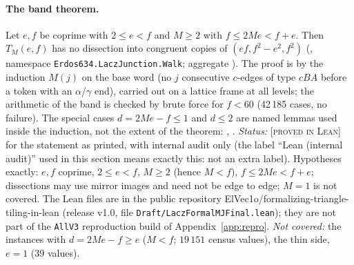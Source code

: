 \documentclass[11pt,reqno]{amsart}
\theoremstyle{plain}
\theoremstyle{definition}
\newcommand{\lab}[1]{\textup{[\textsc{#1}]}}
\newcommand{\PL}{\lab{proved in Lean}}
\begin{document}
\paragraph{The band theorem.} Let $e,f$ be coprime with $2\le e<f$ and $M\ge2$ with $f\le 2Me<f+e$. Then $T_M(e,f)$ has no dissection into congruent copies of $(ef,f^2-e^2,f^2)$
(, namespace \texttt{Erdos634.LaczJunction.Walk}; aggregate ). The proof is by the induction $M(j)$ on the base word (no $j$ consecutive $c$-edges of type $cBA$ before a token with an $\alpha$/$\gamma$ end), carried out on a lattice frame at all levels; the arithmetic of the band is checked by brute force for $f<60$ (42\,185 cases, no failure). The special cases $d=2Me-f\le1$ and $d\le2$ are named lemmas used inside the induction, not the extent of the theorem: , .
\emph{Status:} \PL{} for the statement as printed, with internal audit only (the label ``Lean (internal audit)'' used in this section means exactly this: not an extra label). Hypotheses exactly: $e,f$ coprime, $2\le e<f$, $M\ge2$ (hence $M<f$), $f\le2Me<f+e$; dissections may use mirror images and need not be edge to edge; $M=1$ is not covered. The Lean files are in the public repository ElVec1o/formalizing-triangle-tiling-in-lean (release v1.0, file \texttt{Draft/LaczFormalMJFinal.lean}); they are not part of the \texttt{AllV3} reproduction build of Appendix~\ref{app:repro}. \emph{Not covered:} the instances with $d=2Me-f\ge e$ ($M<f$; $19\,151$ census values), the thin side, $e=1$ ($39$ values).
\end{document}
